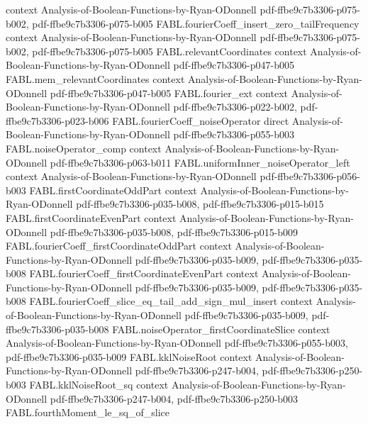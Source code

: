 \begin{theorem}
  {context}
  {Analysis-of-Boolean-Functions-by-Ryan-ODonnell}
  {pdf-ffbe9c7b3306-p075-b002,
    pdf-ffbe9c7b3306-p075-b005}
\proofstep
  {FABL.fourierCoeff_insert_zero_tailFrequency}
  {context}
  {Analysis-of-Boolean-Functions-by-Ryan-ODonnell}
  {pdf-ffbe9c7b3306-p075-b002,
    pdf-ffbe9c7b3306-p075-b005}
\proofstep
  {FABL.relevantCoordinates}
  {context}
  {Analysis-of-Boolean-Functions-by-Ryan-ODonnell}
  {pdf-ffbe9c7b3306-p047-b005}
\proofstep
  {FABL.mem_relevantCoordinates}
  {context}
  {Analysis-of-Boolean-Functions-by-Ryan-ODonnell}
  {pdf-ffbe9c7b3306-p047-b005}
\proofstep
  {FABL.fourier_ext}
  {context}
  {Analysis-of-Boolean-Functions-by-Ryan-ODonnell}
  {pdf-ffbe9c7b3306-p022-b002,
    pdf-ffbe9c7b3306-p023-b006}
\proofstep
  {FABL.fourierCoeff_noiseOperator}
  {direct}
  {Analysis-of-Boolean-Functions-by-Ryan-ODonnell}
  {pdf-ffbe9c7b3306-p055-b003}
\proofstep
  {FABL.noiseOperator_comp}
  {context}
  {Analysis-of-Boolean-Functions-by-Ryan-ODonnell}
  {pdf-ffbe9c7b3306-p063-b011}
\proofstep
  {FABL.uniformInner_noiseOperator_left}
  {context}
  {Analysis-of-Boolean-Functions-by-Ryan-ODonnell}
  {pdf-ffbe9c7b3306-p056-b003}
\proofstep
  {FABL.firstCoordinateOddPart}
  {context}
  {Analysis-of-Boolean-Functions-by-Ryan-ODonnell}
  {pdf-ffbe9c7b3306-p035-b008,
    pdf-ffbe9c7b3306-p015-b015}
\proofstep
  {FABL.firstCoordinateEvenPart}
  {context}
  {Analysis-of-Boolean-Functions-by-Ryan-ODonnell}
  {pdf-ffbe9c7b3306-p035-b008,
    pdf-ffbe9c7b3306-p015-b009}
\proofstep
  {FABL.fourierCoeff_firstCoordinateOddPart}
  {context}
  {Analysis-of-Boolean-Functions-by-Ryan-ODonnell}
  {pdf-ffbe9c7b3306-p035-b009,
    pdf-ffbe9c7b3306-p035-b008}
\proofstep
  {FABL.fourierCoeff_firstCoordinateEvenPart}
  {context}
  {Analysis-of-Boolean-Functions-by-Ryan-ODonnell}
  {pdf-ffbe9c7b3306-p035-b009,
    pdf-ffbe9c7b3306-p035-b008}
\proofstep
  {FABL.fourierCoeff_slice_eq_tail_add_sign_mul_insert}
  {context}
  {Analysis-of-Boolean-Functions-by-Ryan-ODonnell}
  {pdf-ffbe9c7b3306-p035-b009,
    pdf-ffbe9c7b3306-p035-b008}
\proofstep
  {FABL.noiseOperator_firstCoordinateSlice}
  {context}
  {Analysis-of-Boolean-Functions-by-Ryan-ODonnell}
  {pdf-ffbe9c7b3306-p055-b003,
    pdf-ffbe9c7b3306-p035-b009}
\proofstep
  {FABL.kklNoiseRoot}
  {context}
  {Analysis-of-Boolean-Functions-by-Ryan-ODonnell}
  {pdf-ffbe9c7b3306-p247-b004,
    pdf-ffbe9c7b3306-p250-b003}
\proofstep
  {FABL.kklNoiseRoot_sq}
  {context}
  {Analysis-of-Boolean-Functions-by-Ryan-ODonnell}
  {pdf-ffbe9c7b3306-p247-b004,
    pdf-ffbe9c7b3306-p250-b003}
\proofstep
  {FABL.fourthMoment_le_sq_of_slice}

\end{theorem}
